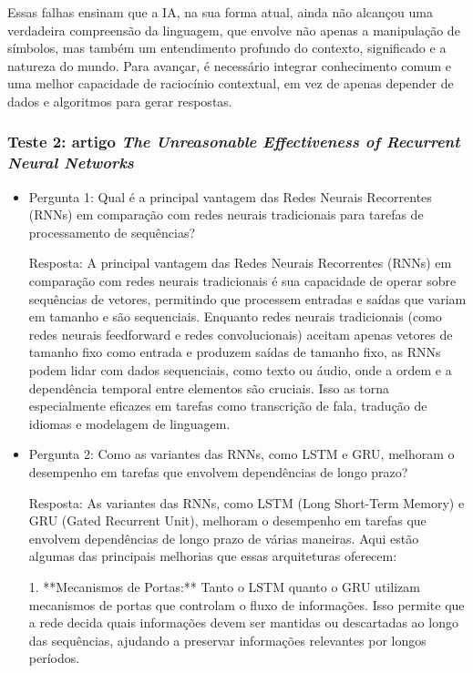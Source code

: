 \documentclass[12 pt]{article}
\begin{document}
\begin{itemize}
    Essas falhas ensinam que a IA, na sua forma atual, ainda não alcançou uma verdadeira compreensão da linguagem, que envolve não apenas a manipulação de símbolos, mas também um entendimento profundo do contexto, significado e a natureza do mundo. Para avançar, é necessário integrar conhecimento comum e uma melhor capacidade de raciocínio contextual, em vez de apenas depender de dados e algoritmos para gerar respostas.
\end{itemize}

\subsubsection*{Teste 2: artigo \textit{The Unreasonable Effectiveness of Recurrent Neural Networks}}
\begin{itemize}
    \item Pergunta 1: Qual é a principal vantagem das Redes Neurais Recorrentes (RNNs) em comparação com redes neurais tradicionais para tarefas de processamento de sequências?

    Resposta: A principal vantagem das Redes Neurais Recorrentes (RNNs) em comparação com redes 
    neurais tradicionais é sua capacidade de operar sobre sequências de vetores, permitindo que 
    processem entradas e saídas que variam em tamanho e são sequenciais. Enquanto redes neurais 
    tradicionais (como redes neurais feedforward e redes convolucionais) aceitam apenas vetores 
    de tamanho fixo como entrada e produzem saídas de tamanho fixo, as RNNs podem lidar com dados sequenciais, como texto ou áudio, onde a ordem e a dependência temporal entre elementos são cruciais. Isso as torna especialmente eficazes em tarefas como transcrição de fala, tradução de idiomas e modelagem de linguagem.
    
    \item Pergunta 2: Como as variantes das RNNs, como LSTM e GRU, melhoram o desempenho em tarefas que envolvem dependências de longo prazo?

    Resposta: As variantes das RNNs, como LSTM (Long Short-Term Memory) e GRU (Gated Recurrent Unit), melhoram o desempenho em tarefas que envolvem dependências de longo prazo de várias maneiras. Aqui estão algumas das principais melhorias que essas arquiteturas oferecem:        
    
    1. **Mecanismos de Portas:** Tanto o LSTM quanto o GRU utilizam mecanismos de portas que controlam o fluxo de informações. Isso permite que a rede decida quais informações devem ser mantidas ou descartadas ao longo das sequências, ajudando a preservar informações relevantes por longos períodos.
    

\end{itemize}
\end{document}

